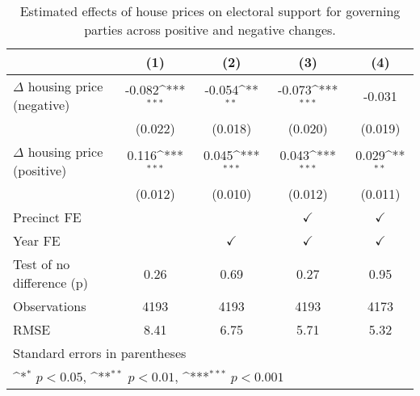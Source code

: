\begin{table}[htbp]\centering
\def\sym#1{\ifmmode^{#1}\else\(^{#1}\)\fi}
\caption{Estimated effects of house prices on electoral support for governing parties across positive and negative changes.} \label{preposneg}
\begin{tabular}{l*{4}{c}}
\hline\hline
                    &\multicolumn{1}{c}{(1)}         &\multicolumn{1}{c}{(2)}         &\multicolumn{1}{c}{(3)}         &\multicolumn{1}{c}{(4)}         \\
\hline
$\Delta$ housing price (negative)&      -0.082\sym{***}&      -0.054\sym{**} &      -0.073\sym{***}&      -0.031         \\
                    &     (0.022)         &     (0.018)         &     (0.020)         &     (0.019)         \\
[1em]
$\Delta$ housing price (positive)&       0.116\sym{***}&       0.045\sym{***}&       0.043\sym{***}&       0.029\sym{**} \\
                    &     (0.012)         &     (0.010)         &     (0.012)         &     (0.011)         \\
[1em]
\hline Precinct FE  &                     &                     &$\checkmark$         &$\checkmark$         \\
[1em]
Year FE             &                     &$\checkmark$         &$\checkmark$         &$\checkmark$         \\
\hline
Test of no difference (p)&        0.26         &        0.69         &        0.27         &        0.95         \\
Observations        &        4193         &        4193         &        4193         &        4173         \\
RMSE                &        8.41         &        6.75         &        5.71         &        5.32         \\
\hline\hline
\multicolumn{5}{l}{\footnotesize Standard errors in parentheses}\\
\multicolumn{5}{l}{\footnotesize \sym{*} \(p<0.05\), \sym{**} \(p<0.01\), \sym{***} \(p<0.001\)}\\
\end{tabular}
\end{table}
